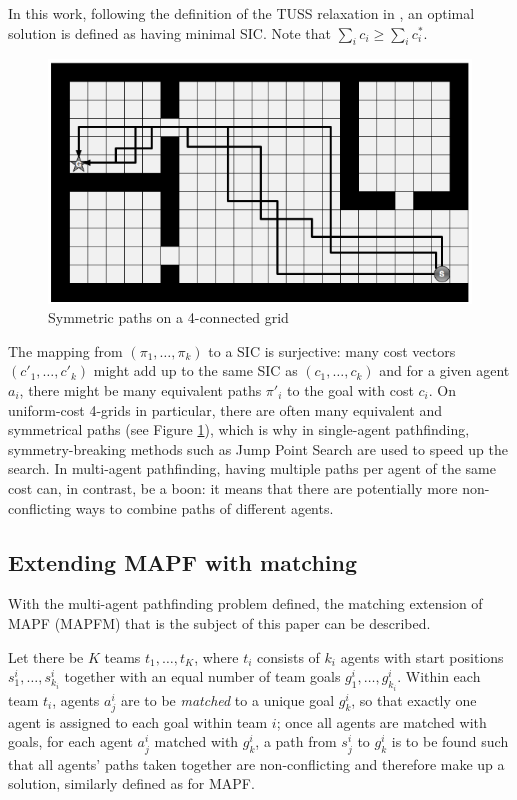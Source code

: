 \documentclass[english]{article}
\begin{document}
	In this work, following the definition of the TUSS relaxation in \cite{mulderij2020}, an optimal solution is defined as having minimal SIC. Note that $\sum_i c_i \geq \sum_i c^*_i$.
	\begin{figure}
		\vspace{-10pt}
		\centering
		\includegraphics[width=\linewidth]{img/symmetries}
		\caption{Symmetric paths on a 4-connected grid\cite{harabor2010}}
		\label{fig:symmetries}
	\end{figure}
	The mapping from $(\pi_1,\ldots,\pi_k)$ to a SIC is surjective: many cost vectors $(c'_1,\ldots,c'_k)$ might add up to the same SIC as $(c_1,\ldots,c_k)$ and for a given agent $a_i$, there might be many equivalent paths $\pi'_i$ to the goal with cost $c_i$. On uniform-cost 4-grids in particular, there are often many equivalent and symmetrical paths\cite{harabor2010} (see Figure \ref{fig:symmetries}), which is why in single-agent pathfinding, symmetry-breaking methods such as Jump Point Search\cite{harabor2011} are used to speed up the search. In multi-agent pathfinding, having multiple paths per agent of the same cost can, in contrast, be a boon: it means that there are potentially more non-conflicting ways to combine paths of different agents.
	
	\subsection{Extending MAPF with matching}
	With the multi-agent pathfinding problem defined, the matching extension of MAPF (MAPFM) that is the subject of this paper can be described.
	
	Let there be $K$ teams $t_1,\ldots, t_K$, where $t_i$ consists of $k_i$ agents with start positions $s_1^i,\ldots,s_{k_i}^i$ together with an equal number of team goals $g_1^i,\ldots,g_{k_i}^i$. Within each team $t_i$, agents $a_j^i$ are to be \textit{matched} to a unique goal $g_k^i$, so that exactly one agent is assigned to each goal within team $i$; once all agents are matched with goals, for each agent $a_j^i$ matched with $g_k^i$, a path from $s_j^i$ to $g_k^i$ is to be found such that all agents' paths taken together are non-conflicting and therefore make up a solution, similarly defined as for MAPF.
	
\end{document}
